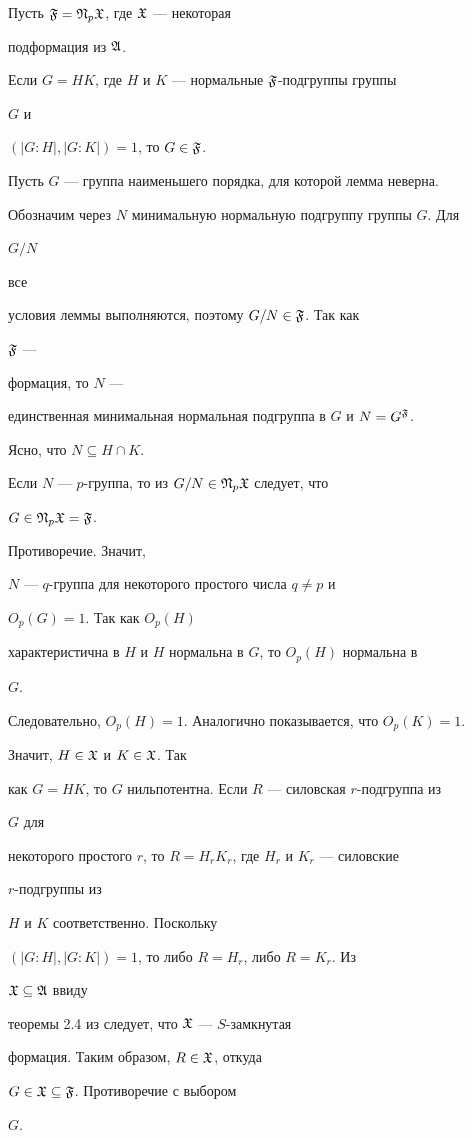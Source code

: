 \begin{lem}


Пусть $\frak F=\frak N_p\frak X$, где $\frak X$ --- некоторая


подформация из $\frak A$.


Если $G=HK$, где $H$ и $K$ --- нормальные $\frak F$-подгруппы группы


$G$ и


$(|G{:}H|,|G{:}K|)=1$, то $G\in\frak F$.


\end{lem}





\begin{pf}


Пусть $G$ --- группа наименьшего порядка, для которой лемма неверна.


Обозначим через $N$ минимальную нормальную подгруппу группы $G$. Для


$G/N$


все


условия леммы выполняются, поэтому $G/N\in\frak F$. Так как


$\frak F$ ---


формация, то $N$ ---


единственная минимальная нормальная подгруппа в $G$ и $N=G^{\frak F}$.


Ясно, что $N\subseteq H\cap K$.


Если $N$ --- $p$-группа, то из $G/N\in\frak N_p\frak X$ следует, что


$G\in\frak N_p\frak X=\frak F$.


Противоречие. Значит,


$N$ --- $q$-группа для некоторого простого числа $q\ne p$ и


$O_p(G)=1$. Так как $O_p(H)$


характеристична в $H$ и $H$ нормальна в $G$, то $O_p(H)$ нормальна в


$G$.


Следовательно, $O_p(H)=1$. Аналогично показывается, что $O_p(K)=1$.


Значит, $H\in \frak X$ и $K\in\frak X$. Так


как $G=HK$, то $G$ нильпотентна. Если $R$ --- силовская $r$-подгруппа из


$G$ для


некоторого простого $r$, то $R=H_rK_r$, где $H_r$ и $K_r$ --- силовские


$r$-подгруппы из


$H$ и $K$ соответственно. Поскольку


$(|G{:}H|,|G{:}K|)=1$, то либо $R=H_r$, либо $R=K_r$. Из


$\frak X\subseteq\frak A$ ввиду


теоремы 2.4 из \cite{She} следует, что $\frak X$ --- $S$-замкнутая


формация. Таким образом, $R\in\frak X$, откуда


$G\in\frak X\subseteq\frak F$. Противоречие с выбором


$G$.


\end{pf}





